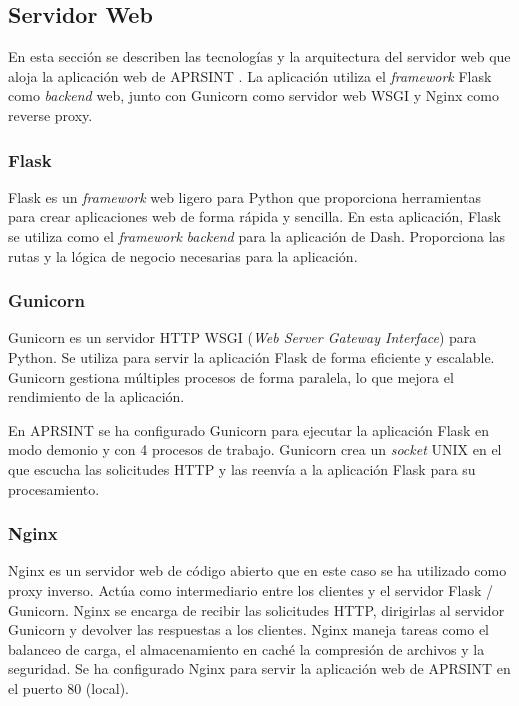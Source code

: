\subsection{Servidor Web}

En esta sección se describen las tecnologías y la arquitectura del servidor web que aloja la aplicación web de APRSINT \cite{WebServer}. La aplicación utiliza el \textit{framework} Flask como \textit{backend} web, junto con Gunicorn como servidor web WSGI y Nginx como reverse proxy.

\subsubsection*{Flask}

Flask es un \textit{framework} web ligero para Python que proporciona herramientas para crear aplicaciones web de forma rápida y sencilla. En esta aplicación, Flask se utiliza como el \textit{framework} \textit{backend} para la aplicación de Dash. Proporciona las rutas y la lógica de negocio necesarias para la aplicación.

\subsubsection*{Gunicorn}

Gunicorn es un servidor HTTP WSGI (\textit{Web Server Gateway Interface}) para Python. Se utiliza para servir la aplicación Flask de forma eficiente y escalable. Gunicorn gestiona múltiples procesos de forma paralela, lo que mejora el rendimiento de la aplicación.

En APRSINT se ha configurado Gunicorn para ejecutar la aplicación Flask en modo demonio y con 4 procesos de trabajo. Gunicorn crea un \textit{socket} UNIX en el que escucha las solicitudes HTTP y las reenvía a la aplicación Flask para su procesamiento.

\subsubsection*{Nginx}

Nginx es un servidor web de código abierto que en este caso se ha utilizado como proxy inverso. Actúa como intermediario entre los clientes y el servidor Flask / Gunicorn. Nginx se encarga de recibir las solicitudes HTTP, dirigirlas al servidor Gunicorn y devolver las respuestas a los clientes. Nginx maneja tareas como el balanceo de carga, el almacenamiento en caché la compresión de archivos y la seguridad. Se ha configurado Nginx para servir la aplicación web de APRSINT en el puerto 80 (local).

